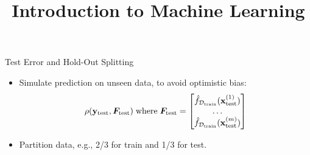 \documentclass[11pt,compress,t,notes=noshow, xcolor=table]{beamer}
\title{Introduction to Machine Learning}
\begin{document}

\begin{vbframe}{Test Error and Hold-Out Splitting}

  \small
\begin{itemize}
  \item Simulate prediction on unseen data, to avoid optimistic bias:
\small
$$\rho(\yv_{\mathrm{test}}, \F_{\textrm{test}})\;\text{where}\; 
\F_{\textrm{test}} = \begin{bmatrix} 
\fhDtrain(\xi[1]_{\textrm{test}}) \\ 
\dots \\
\fhDtrain(\xi[m]_{\textrm{test}})
\end{bmatrix}$$ 
  \item Partition data, e.g., 2/3 for train and 1/3 for test.
\end{itemize}


\end{vbframe}
\end{document}
